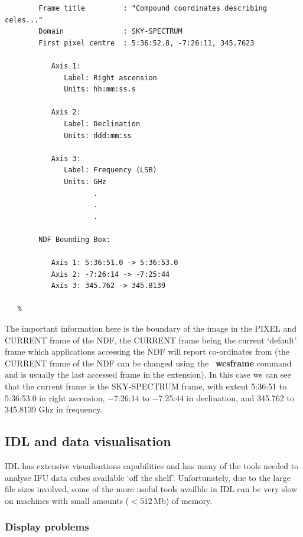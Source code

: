 \documentclass[twoside,11pt]{article}
\newcommand{\htmladdnormallink}[2]{#1}
\newcommand{\xref}[3]{#1}
\newcommand{\xlabel}[1]{}
\begin{document}
{\begin{verbatim}
        Frame title         : "Compound coordinates describing celes..."
        Domain              : SKY-SPECTRUM
        First pixel centre  : 5:36:52.8, -7:26:11, 345.7623

           Axis 1:
              Label: Right ascension
              Units: hh:mm:ss.s

           Axis 2:
              Label: Declination
              Units: ddd:mm:ss

           Axis 3:
              Label: Frequency (LSB)
              Units: GHz
                     .
                     .
                     .

        NDF Bounding Box:

           Axis 1: 5:36:51.0 -> 5:36:53.0
           Axis 2: -7:26:14 -> -7:25:44
           Axis 3: 345.762 -> 345.8139

   %
\end{verbatim}\normalsize

The important information here is the boundary of the image in the
PIXEL and CURRENT frame of the NDF, the CURRENT frame being the
current `default' frame which applications accessing the NDF will
report co-ordinates from (the CURRENT frame of the NDF can be changed
using the \KAPPA\ \xref{{\bf wcsframe}}{sun95}{WCSFRAME} command and is
usually the last accessed frame in the extension).  In this case we can
see that the current frame is the SKY-SPECTRUM frame, with extent
5:36:51 to 5:36:53.0 in right ascension, $-$7:26:14 to $-$7:25:44 in
declination, and 345.762 to 345.8139 Ghz in frequency.


\subsection{\xlabel{sc16_idl}IDL and data visualisation\label{sc16_idl}}

\htmladdnormallink{IDL}{http://www.rsinc.com/} has extensive
visualisations capabilities and has many of the tools needed to
analyse IFU data cubes available `off the shelf'.  Unfortunately, due
to the large file sizes involved, some of the more useful tools
availble in IDL can be very slow on machines with small amounts
($<512$\,Mb) of memory.

\subsubsection{Display problems}

}
\end{document}
